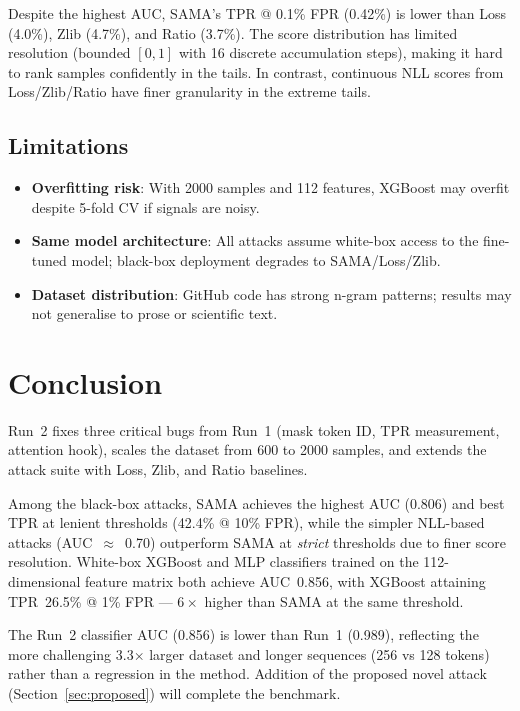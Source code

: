 \documentclass[11pt,a4paper]{article}
\begin{document}
Despite the highest AUC, SAMA's TPR @ 0.1\% FPR (0.42\%) is lower than Loss
(4.0\%), Zlib (4.7\%), and Ratio (3.7\%).
The score distribution has limited resolution (bounded $[0,1]$ with 16 discrete
accumulation steps), making it hard to rank samples confidently in the tails.
In contrast, continuous NLL scores from Loss/Zlib/Ratio have finer granularity
in the extreme tails.

\subsection{Limitations}

\begin{itemize}
  \item \textbf{Overfitting risk}: With 2000 samples and 112 features,
        XGBoost may overfit despite 5-fold CV if signals are noisy.
  \item \textbf{Same model architecture}: All attacks assume white-box access
        to the fine-tuned model; black-box deployment degrades to SAMA/Loss/Zlib.
  \item \textbf{Dataset distribution}: GitHub code has strong n-gram patterns;
        results may not generalise to prose or scientific text.
\end{itemize}

\section{Conclusion}

Run~2 fixes three critical bugs from Run~1 (mask token ID, TPR measurement,
attention hook), scales the dataset from 600 to 2000 samples, and extends the
attack suite with Loss, Zlib, and Ratio baselines.

Among the black-box attacks, SAMA achieves the highest AUC (0.806) and best TPR
at lenient thresholds (42.4\% @ 10\% FPR), while the simpler NLL-based attacks
(AUC~$\approx$~0.70) outperform SAMA at \emph{strict} thresholds due to finer
score resolution.  White-box XGBoost and MLP classifiers trained on the
112-dimensional feature matrix both achieve AUC~0.856, with XGBoost attaining
TPR~26.5\% @ 1\% FPR — $6\times$ higher than SAMA at the same threshold.

The Run~2 classifier AUC (0.856) is lower than Run~1 (0.989), reflecting the
more challenging 3.3$\times$ larger dataset and longer sequences (256 vs 128 tokens)
rather than a regression in the method.  Addition of the proposed novel attack
(Section~\ref{sec:proposed}) will complete the benchmark.
\end{document}
